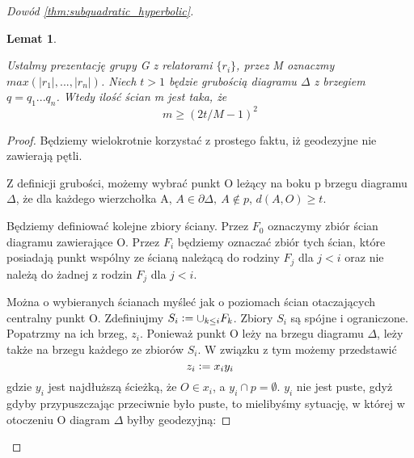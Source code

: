 \documentclass[licencjacka]{pracamgr}
\newcommand{\defeq}{\vcentcolon=}
\newtheorem{lemma}{Lemat}[section]
\begin{document}
\begin{proof}[Dowód \ref{thm:subquadratic_hyperbolic}]

\begin{lemma}\label{lemma:olshanskii_5}

Ustalmy prezentację grupy G z relatorami $\{ r_{i} \}$, przez M oznaczmy $max(|r_{1}|, ..., |r_{n}|)$. 
Niech $t > 1$ będzie grubością diagramu $\Delta$ z brzegiem $q=q_{1}...q_{n}$. Wtedy ilość ścian m jest taka, że
\[ m \geq (2t/M - 1) ^2 \]

\end{lemma}

\begin{proof}

Będziemy wielokrotnie korzystać z prostego faktu, iż geodezyjne nie zawierają pętli.

Z definicji grubości, możemy wybrać punkt O leżący na boku p brzegu diagramu $\Delta$, że dla każdego wierzchołka  A, $ A \in \partial \Delta, \ A \notin p$, $d(A, O) \geq t$.

Będziemy definiować kolejne zbiory ściany. Przez $F_{0}$ oznaczymy zbiór ścian diagramu zawierające O. Przez $F_{i}$ będziemy oznaczać zbiór tych ścian, które posiadają punkt wspólny ze ścianą należącą do rodziny $F_{j}$ dla $j < i$ oraz nie należą do żadnej z rodzin $F_{j}$ dla $j < i$.

Można o wybieranych ścianach myśleć jak o poziomach ścian otaczających centralny punkt O. Zdefiniujmy $S_{i} \defeq \cup_{k \leq i} F_{k}$. Zbiory $S_{i}$ są spójne i ograniczone. Popatrzmy na ich brzeg, $z_{i}$. Ponieważ punkt O leży na brzegu diagramu $\Delta$, leży także na brzegu każdego ze zbiorów $S_{i}$. W związku z tym możemy przedstawić
\[ z_{i} \defeq x_{i} y_{i} \]
gdzie $y_{i}$ jest najdłuższą ścieżką, że $O \in x_{i}$, a $y_{i} \cap p = \emptyset$. $y_i$ nie jest puste, gdyż gdyby przypuszczając przeciwnie było puste, to mielibyśmy sytuację, w której w otoczeniu O diagram $\Delta$ byłby geodezyjną:

\end{proof}
\end{proof}
\end{document}
